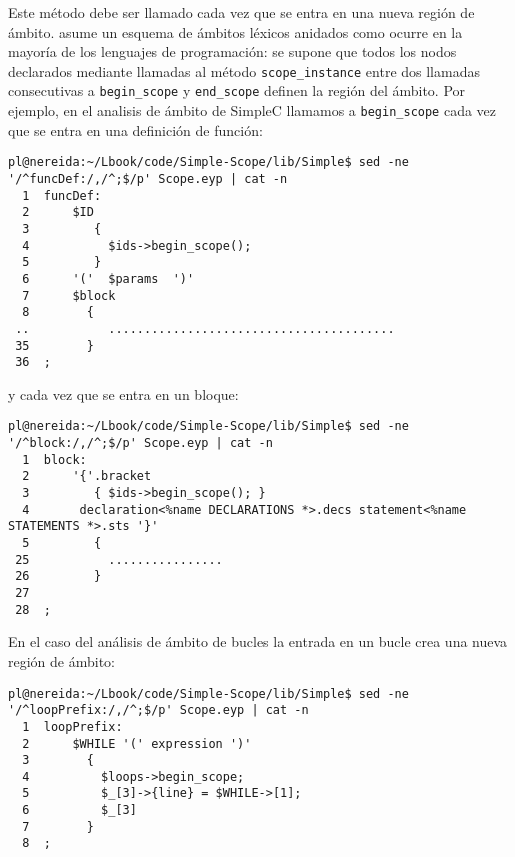 
Este método debe ser llamado cada vez que se entra en una nueva región de ámbito.
 asume un esquema de ámbitos léxicos anidados como ocurre en la mayoría
de los lenguajes de programación: se supone que 
todos los nodos declarados mediante llamadas al método \verb|scope_instance|
entre dos llamadas consecutivas a \verb|begin_scope| y \verb|end_scope|
definen la región del ámbito.
Por ejemplo, en el analisis de ámbito de SimpleC llamamos a
\verb|begin_scope| cada vez que se entra en una definición de función:
\begin{verbatim}
pl@nereida:~/Lbook/code/Simple-Scope/lib/Simple$ sed -ne '/^funcDef:/,/^;$/p' Scope.eyp | cat -n
  1  funcDef:
  2      $ID
  3         {
  4           $ids->begin_scope();
  5         }
  6      '('  $params  ')'
  7      $block
  8        {
 ..           ........................................
 35        }
 36  ;
\end{verbatim}
y cada vez que se entra en un bloque:
\begin{verbatim}
pl@nereida:~/Lbook/code/Simple-Scope/lib/Simple$ sed -ne '/^block:/,/^;$/p' Scope.eyp | cat -n
  1  block:
  2      '{'.bracket
  3         { $ids->begin_scope(); }
  4       declaration<%name DECLARATIONS *>.decs statement<%name STATEMENTS *>.sts '}'
  5         {
 25           ................
 26         }
 27
 28  ;
\end{verbatim}

En el caso del análisis de
ámbito de bucles la entrada en un bucle crea una nueva región de ámbito:

\begin{verbatim}
pl@nereida:~/Lbook/code/Simple-Scope/lib/Simple$ sed -ne '/^loopPrefix:/,/^;$/p' Scope.eyp | cat -n
  1  loopPrefix:
  2      $WHILE '(' expression ')'
  3        {
  4          $loops->begin_scope;
  5          $_[3]->{line} = $WHILE->[1];
  6          $_[3]
  7        }
  8  ;
\end{verbatim}


